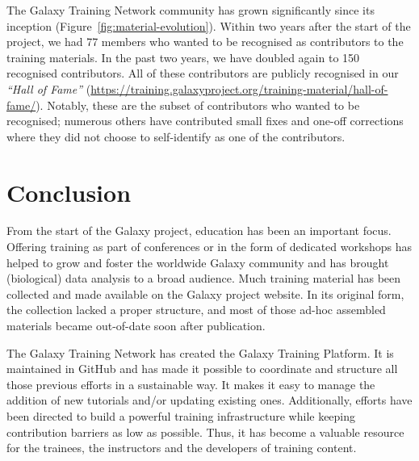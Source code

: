 \documentclass[10pt,letterpaper]{article}
\begin{document}
The Galaxy Training Network community has grown significantly since its inception (Figure~\ref{fig:material-evolution}).
Within two years after the start of the project, we had 77 members who wanted to be recognised as contributors to the training materials.
In the past two years, we have doubled again to 150 recognised contributors.
All of these contributors are publicly recognised in our \emph{“Hall of Fame”} (\url{https://training.galaxyproject.org/training-material/hall-of-fame/}).
Notably, these are the subset of contributors who wanted to be recognised; numerous others have contributed small fixes and one-off corrections where they did not choose to self-identify as one of the contributors.

\section*{Conclusion}

From the start of the Galaxy project, education has been an important focus. Offering training as part of conferences or in the form of dedicated workshops has helped to grow and foster the worldwide Galaxy community and has brought (biological) data analysis to a broad audience. Much training material has been collected and made available on the Galaxy project website. In its original form, the collection lacked a proper structure, and most of those ad-hoc assembled materials became out-of-date soon after publication.

The Galaxy Training Network has created the Galaxy Training Platform. It is maintained in GitHub and has made it possible to coordinate and structure all those previous efforts in a sustainable way. It makes it easy to manage the addition of new tutorials and/or updating existing ones. Additionally, efforts have been directed to build a powerful training infrastructure while keeping contribution barriers as low as possible. Thus, it has become a valuable resource for the trainees, the instructors and the developers of training content.
\end{document}
